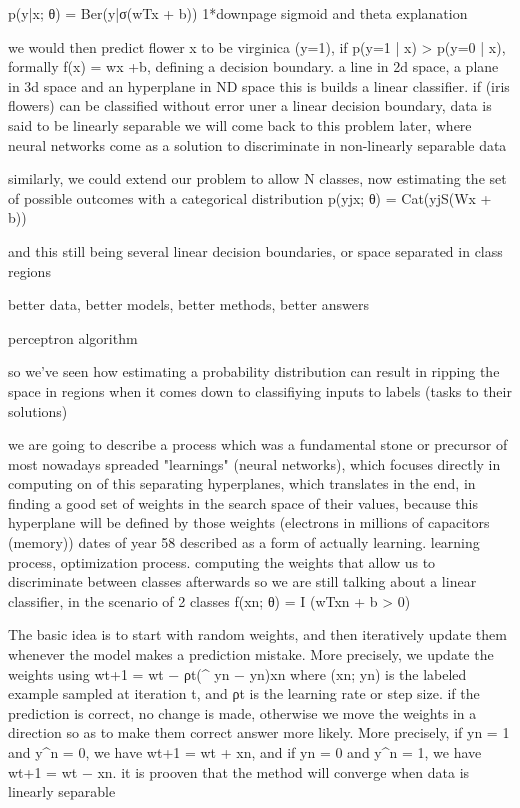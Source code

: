 \documentclass[11pt,english,listoffigures,listoftables]{tfgetsinf}
\begin{document}
p(y|x; θ) = Ber(y|σ(wTx + b))
1*downpage sigmoid and theta explanation

we would then predict flower x to be virginica (y=1), if p(y=1 | x) > p(y=0 | x),
formally 
f(x) = wx +b,
defining a decision boundary. a line in 2d space, a plane in 3d space and an hyperplane in ND space
this is builds a linear classifier. if (iris flowers) can be classified without error uner a linear decision boundary, data is said to be linearly separable
we will come back to this problem later, where neural networks come as a solution to discriminate in non-linearly separable data


similarly, we could extend our problem to allow N classes, now estimating the set of possible outcomes with a categorical distribution
p(yjx; θ) = Cat(yjS(Wx + b))

and this still being several linear decision boundaries, or space separated in class regions




better data, better models, better methods, better answers


perceptron algorithm

so we've seen how estimating a probability distribution can result in ripping the space in regions when it comes down to classifiying inputs to labels (tasks to their solutions)


we are going to describe a process which was a fundamental stone or precursor of most nowadays spreaded "learnings" (neural networks), which focuses directly in computing on of this separating hyperplanes, which translates in the end, in finding a good set of weights in the search space of their values, because this hyperplane will be defined by those weights (electrons in millions of capacitors (memory)) 
dates of year 58
described as a form of actually learning. learning process, optimization process. computing the weights that allow us to discriminate between classes afterwards
so we are still talking about a linear classifier, in the scenario of 2 classes
f(xn; θ) = I (wTxn + b > 0)

The basic idea is to start with random weights, and then iteratively update them whenever
the model makes a prediction mistake. More precisely, we update the weights using
wt+1 = wt − ρt(^ yn − yn)xn 
where (xn; yn) is the labeled example sampled at iteration t, and ρt is the learning rate or step
size.
if the prediction is correct, no change is made, otherwise we move the weights in a direction so as to make them correct
answer more likely. More precisely, if yn = 1 and y^n = 0, we have wt+1 = wt + xn, and if yn = 0
and y^n = 1, we have wt+1 = wt − xn.
it is prooven that the method will converge when data is linearly separable
\end{document}
